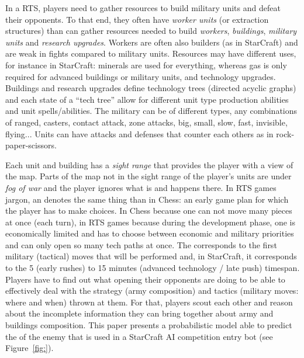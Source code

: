 In a RTS, players need to gather resources to build military units and defeat their opponents. To that end, they often have \textit{worker units} (or extraction structures) than can gather resources needed to build \textit{workers}, \textit{buildings}, \textit{military units} and \textit{research upgrades}. Workers are often also builders (as in StarCraft) and are weak in fights compared to military units. Resources may have different uses, for instance in StarCraft: minerals are used for everything, whereas gas is only required for advanced buildings or military units, and technology upgrades. Buildings and research upgrades define technology trees (directed acyclic graphs) and each state of a ``tech tree'' allow for different unit type production abilities and unit spells/abilities. The military can be of different types, any combinations of ranged, casters, contact attack, zone attacks, big, small, slow, fast, invisible, flying... Units can have attacks and defenses that counter each others as in rock-paper-scissors. 

Each unit and building has a \textit{sight range} that provides the player with a view of the map. Parts of the map not in the sight range of the player's units are under \textit{fog of war} and the player ignores what is and happens there.
In RTS games jargon, an \textit{} denotes the same thing than in Chess: an early game plan for which the player has to make choices. In Chess because one can not move many pieces at once (each turn), in RTS games because during the development phase, one is economically limited and has to choose between economic and military priorities and can only open so many tech paths at once. The \textit{} corresponds to the first military (tactical) moves that will be performed and, in StarCraft, it corresponds to the 5 (early rushes) to 15 minutes (advanced technology / late push) timespan. 
Players have to find out what opening their opponents are doing to be able to effectively deal with the strategy (army composition) and tactics (military moves: where and when) thrown at them. For that, players scout each other and reason about the incomplete information they can bring together about army and buildings composition. This paper presents a probabilistic model able to predict the \textit{} of the enemy that is used in a StarCraft AI competition entry bot (see Figure~\ref{fig:}).

